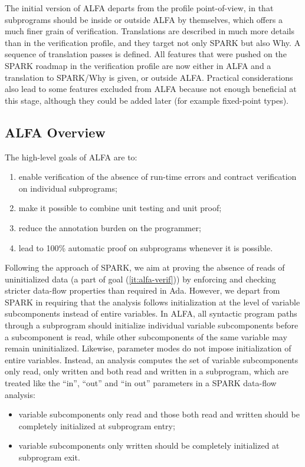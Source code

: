 \documentclass{article}
\newcounter{example}
\begin{document}
The initial version of ALFA departs from the profile point-of-view, in that
subprograms should be inside or outside ALFA by themselves, which offers a much
finer grain of verification. Translations are described in much more details
than in the verification profile, and they target not only SPARK but also
Why. A sequence of translation passes is defined. All features that were pushed
on the SPARK roadmap in the verification profile are now either in ALFA and a
translation to SPARK/Why is given, or outside ALFA. Practical considerations
also lead to some features excluded from ALFA because not enough beneficial at
this stage, although they could be added later (for example fixed-point types).

\subsection{ALFA Overview}

The high-level goals of ALFA are to:
\begin{enumerate}
\item \label{it:alfa-verif} enable verification of the absence of run-time
  errors and contract verification on individual subprograms;
\item \label{it:alfa-combine} make it possible to combine unit testing and unit
  proof;
\item \label{it:alfa-annot} reduce the annotation burden on the programmer;
\item \label{it:alfa-auto} lead to 100\% automatic proof on subprograms
  whenever it is possible.
\end{enumerate}

Following the approach of SPARK, we aim at proving the absence of reads of
uninitialized data (a part of goal (\ref{it:alfa-verif})) by enforcing and
checking stricter data-flow properties than required in Ada. However, we depart
from SPARK in requiring that the analysis follows initialization at the level
of variable subcomponents instead of entire variables. In ALFA, all syntactic
program paths through a subprogram should initialize individual variable
subcomponents before a subcomponent is read, while other subcomponents of the
same variable may remain uninitialized. Likewise, parameter modes do not impose
initialization of entire variables. Instead, an analysis computes the set of
variable subcomponents only read, only written and both read and written in a
subprogram, which are treated like the ``in'', ``out'' and ``in out''
parameters in a SPARK data-flow analysis:
\begin{itemize}
\item variable subcomponents only read and those both read and written should
  be completely initialized at subprogram entry;
\item variable subcomponents only written should be completely initialized at
  subprogram exit.
\end{itemize}
\end{document}
